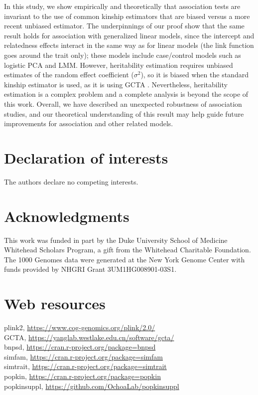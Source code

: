 \documentclass[11pt]{article}
\begin{document}
\begin{linenumbers}
In this study, we show empirically and theoretically that association tests are invariant to the use of common kinship estimators that are biased versus a more recent unbiased estimator.
The underpinnings of our proof show that the same result holds for association with generalized linear models, since the intercept and relatedness effects interact in the same way as for linear models (the link function goes around the trait only); these models include case/control models such as logistic PCA and LMM.
However, heritability estimation requires unbiased estimates of the random effect coefficient ($\sigma^2$), so it is biased when the standard kinship estimator is used, as it is using GCTA \citep{yang_gcta:_2011, yang_advantages_2014}.
Nevertheless, heritability estimation is a complex problem and a complete analysis is beyond the scope of this work.
Overall, we have described an unexpected robustness of association studies, and our theoretical understanding of this result may help guide future improvements for association and other related models.



\section*{Declaration of interests}
The authors declare no competing interests.

\section*{Acknowledgments}
This work was funded in part by the Duke University School of Medicine Whitehead Scholars Program, a gift from the Whitehead Charitable Foundation.
The 1000 Genomes data were generated at the New York Genome Center with funds provided by NHGRI Grant 3UM1HG008901-03S1.

\section*{Web resources}
plink2, \url{https://www.cog-genomics.org/plink/2.0/}\\
GCTA, \url{https://yanglab.westlake.edu.cn/software/gcta/}\\
bnpsd, \url{https://cran.r-project.org/package=bnpsd}\\
simfam, \url{https://cran.r-project.org/package=simfam}\\
simtrait, \url{https://cran.r-project.org/package=simtrait}\\
popkin, \url{https://cran.r-project.org/package=popkin}\\
popkinsuppl, \url{https://github.com/OchoaLab/popkinsuppl}


\end{linenumbers}
\end{document}
